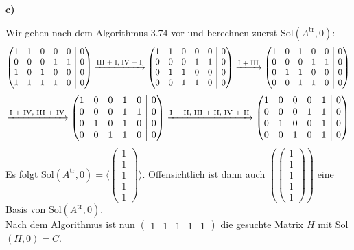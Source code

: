 \documentclass[a4paper,graphics,11pt]{article}
\newcommand{\vect}[5]{\begin{pmatrix}#1\\#2\\#3\\#4\\#5\end{pmatrix}}
\begin{document}
\newpage 

\textbf{c)}

Wir gehen nach dem Algorithmus 3.74 vor und berechnen zuerst Sol$(A^\text{tr}, 0)$:
$$
    \begin{array}({@{}ccccc|c@{}})
        1 & 1 & 0 & 0 & 0 & 0\\
        0 & 0 & 0 & 1 & 1 & 0\\
        1 & 0 & 1 & 0 & 0 & 0\\
        1 & 1 & 1 & 1 & 0 & 0\\
    \end{array}
    \xrightarrow {\text{III + I, IV + I}}
    \begin{array}({@{}ccccc|c@{}})
        1 & 1 & 0 & 0 & 0 & 0\\
        0 & 0 & 0 & 1 & 1 & 0\\
        0 & 1 & 1 & 0 & 0 & 0\\
        0 & 0 & 1 & 1 & 0 & 0\\
    \end{array}
    \xrightarrow {\text{I + III}}
    \begin{array}({@{}ccccc|c@{}})
        1 & 0 & 1 & 0 & 0 & 0\\
        0 & 0 & 0 & 1 & 1 & 0\\
        0 & 1 & 1 & 0 & 0 & 0\\
        0 & 0 & 1 & 1 & 0 & 0\\
    \end{array}
$$$$
    \xrightarrow {\text{I + IV, III + IV}}
    \begin{array}({@{}ccccc|c@{}})
        1 & 0 & 0 & 1 & 0 & 0\\
        0 & 0 & 0 & 1 & 1 & 0\\
        0 & 1 & 0 & 1 & 0 & 0\\
        0 & 0 & 1 & 1 & 0 & 0\\
    \end{array}
    \xrightarrow {\text{I + II, III + II, IV + II}}
    \begin{array}({@{}ccccc|c@{}})
        1 & 0 & 0 & 0 & 1 & 0\\
        0 & 0 & 0 & 1 & 1 & 0\\
        0 & 1 & 0 & 0 & 1 & 0\\
        0 & 0 & 1 & 0 & 1 & 0\\
    \end{array}
$$
Es folgt Sol$(A^\text{tr}, 0) = \langle \vect{1}{1}{1}{1}{1}\rangle$.
Offensichtlich ist dann auch $(\vect{1}{1}{1}{1}{1})$ eine Basis von Sol$(A^\text{tr}, 0)$.\\
Nach dem Algorithmus ist nun $\begin{pmatrix}1 & 1& 1& 1& 1\end{pmatrix}$ die gesuchte Matrix $H$ mit Sol$(H,0) = C$.
\end{document}
